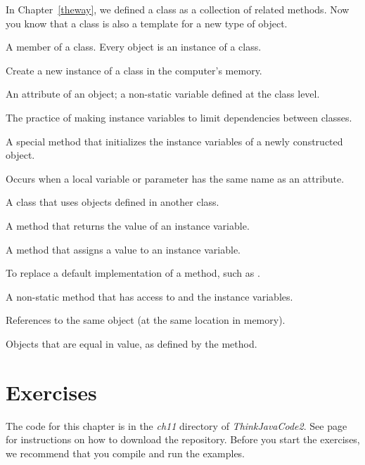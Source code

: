 \begin{description}

In Chapter~\ref{theway}, we defined a class as a collection of related methods.
Now you know that a class is also a template for a new type of object.

A member of a class.
Every object is an instance of a class.

Create a new instance of a class in the computer's memory.


An attribute of an object; a non-static variable defined at the class level.

The practice of making instance variables  to limit dependencies between classes.

A special method that initializes the instance variables of a newly constructed object.

Occurs when a local variable or parameter has the same name as an attribute.

A class that uses objects defined in another class.

A method that returns the value of an instance variable.

A method that assigns a value to an instance variable.

To replace a default implementation of a method, such as .

A non-static method that has access to  and the instance variables.

References to the same object (at the same location in memory).

Objects that are equal in value, as defined by the  method.

\end{description}


\section{Exercises}

The code for this chapter is in the {\it ch11} directory of {\it ThinkJavaCode2}.
See page~\pageref{code} for instructions on how to download the repository.
Before you start the exercises, we recommend that you compile and run the examples.


